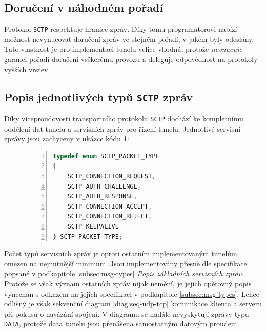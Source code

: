 \documentclass[thesis=M,czech]{FITthesis}[2012/10/20]
\begin{document}
    \subsection{Doručení v náhodném pořadí}
    \label{subsec:sctp-unordered-delivery}
    
    Protokol \texttt{SCTP} respektuje hranice zpráv. Díky tomu programátorovi nabízí možnost nevynucovat doručení zpráv ve stejném pořadí, v jakém byly odeslány. Tato vlastnost je pro implementaci tunelu velice vhodná, protože \textit{nevnucuje} garanci pořadí doručení veškerému provozu a deleguje odpovědnost na protokoly vyšších vrstev.
    
    
    
    
  
    \subsection{Popis jednotlivých typů \texttt{SCTP} zpráv}
        
    Díky víceproudovosti transportního protokolu \texttt{SCTP} dochází ke kompletnímu oddělení dat tunelu a servisních zpráv pro řízení tunelu. Jednotlivé servisní zprávy jsou zachyceny v ukázce kódu \ref{code:sctp-types}:
        
    \begin{figure}[h]
	\begin{lstlisting}[caption=Výňatek souboru \texttt{plugins/sctp/packet.h} definující typy \texttt{SCTP} zpráv,language=c,frame=single,numbers=left]
typedef enum SCTP_PACKET_TYPE
{
	SCTP_CONNECTION_REQUEST,
	SCTP_AUTH_CHALLENGE,
	SCTP_AUTH_RESPONSE,
	SCTP_CONNECTION_ACCEPT,
	SCTP_CONNECTION_REJECT,
	SCTP_KEEPALIVE
} SCTP_PACKET_TYPE;
      \end{lstlisting}
      \label{code:sctp-types}
    \end{figure}
    
    Počet typů servisních zpráv je oproti ostatním implementovaným tunelům omezen na nejnutnější minimum. Jsou implementovány přesně dle specifikace popsané v podkapitole \ref{subsec:msg-types} \textit{Popis základních servisních zpráv}. Protože se však význam ostatních zpráv nijak nemění, je jejich opětovný popis vynechán s odkazem na jejich specifikaci v podkapitole \ref{subsec:msg-types}. Lehce odlišný je však sekvenční diagram \ref{diag:seq-udp-tcp} komunikace klienta a serveru při pokusu o navázání spojení. V diagramu se nadále nevyskytují zprávy typu \texttt{DATA}, protože data tunelu jsou přenášena samostatným datovým proudem.
    
\end{document}
